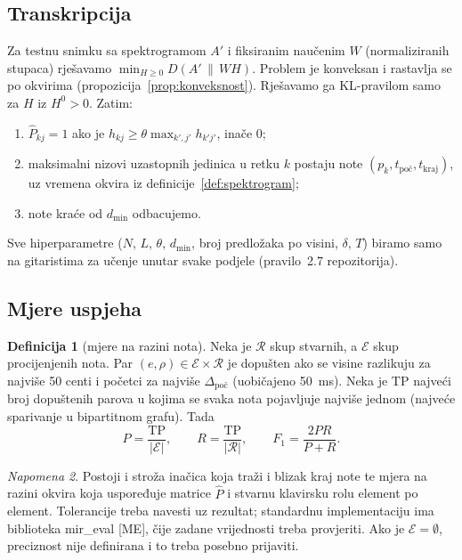 \documentclass[11pt,a4paper]{article}
\theoremstyle{definition}
\newtheorem{definicija}{Definicija}[section]
\theoremstyle{plain}
\theoremstyle{remark}
\newtheorem{napomena}[definicija]{Napomena}
\newcommand{\Dkl}[2]{D(#1\,\|\,#2)}
\begin{document}
\subsection{Transkripcija}

Za testnu snimku sa spektrogramom $A'$ i fiksiranim naučenim $W$ (normaliziranih stupaca) rješavamo
$\min_{H\geq0}\Dkl{A'}{WH}$. Problem je konveksan i rastavlja se po okvirima
(propozicija~\ref{prop:konveksnost}). Rješavamo ga KL-pravilom samo za $H$ iz $H^0>0$. Zatim:
\begin{enumerate}
\item $\hat P_{kj}=1$ ako je $h_{kj}\geq\theta\max_{k',j'}h_{k'j'}$, inače $0$;
\item maksimalni nizovi uzastopnih jedinica u retku $k$ postaju note $(p_k,t_{\mathrm{poč}},t_{\mathrm{kraj}})$,
  uz vremena okvira iz definicije~\ref{def:spektrogram};
\item note kraće od $d_{\min}$ odbacujemo.
\end{enumerate}
Sve hiperparametre ($N$, $L$, $\theta$, $d_{\min}$, broj predložaka po visini, $\delta$, $T$) biramo
samo na gitaristima za učenje unutar svake podjele (pravilo~2.7 repozitorija).

\subsection{Mjere uspjeha}

\begin{definicija}[mjere na razini nota]
Neka je $\mathcal R$ skup stvarnih, a $\mathcal E$ skup procijenjenih nota. Par
$(e,\rho)\in\mathcal E\times\mathcal R$ je dopušten ako se visine razlikuju za najviše 50 centi i
početci za najviše $\Delta_{\mathrm{poč}}$ (uobičajeno 50~ms). Neka je $\mathrm{TP}$ najveći broj
dopuštenih parova u kojima se svaka nota pojavljuje najviše jednom (najveće sparivanje u bipartitnom
grafu). Tada
\[
  P=\frac{\mathrm{TP}}{|\mathcal E|},\qquad R=\frac{\mathrm{TP}}{|\mathcal R|},\qquad
  F_1=\frac{2PR}{P+R}.
\]
\end{definicija}

\begin{napomena}
Postoji i stroža inačica koja traži i blizak kraj note te mjera na razini okvira koja uspoređuje
matrice $\hat P$ i stvarnu klavirsku rolu element po element. Tolerancije treba navesti uz rezultat;
standardnu implementaciju ima biblioteka mir\_eval [ME], čije zadane vrijednosti treba provjeriti.
Ako je $\mathcal E=\emptyset$, preciznost nije definirana i to treba posebno prijaviti.
\end{napomena}
\end{document}
